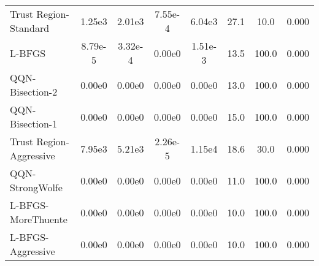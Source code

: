 \documentclass{article}
\begin{document}
\begin{table}[htbp]
{\begin{tabular}{p{2.5cm}*{7}{c}}
Trust Region-Standard & 1.25e3 & 2.01e3 & 7.55e-4 & 6.04e3 & 27.1 & 10.0 & 0.000 \\
L-BFGS & 8.79e-5 & 3.32e-4 & 0.00e0 & 1.51e-3 & 13.5 & 100.0 & 0.000 \\
QQN-Bisection-2 & 0.00e0 & 0.00e0 & 0.00e0 & 0.00e0 & 13.0 & 100.0 & 0.000 \\
QQN-Bisection-1 & 0.00e0 & 0.00e0 & 0.00e0 & 0.00e0 & 15.0 & 100.0 & 0.000 \\
Trust Region-Aggressive & 7.95e3 & 5.21e3 & 2.26e-5 & 1.15e4 & 18.6 & 30.0 & 0.000 \\
QQN-StrongWolfe & 0.00e0 & 0.00e0 & 0.00e0 & 0.00e0 & 11.0 & 100.0 & 0.000 \\
L-BFGS-MoreThuente & 0.00e0 & 0.00e0 & 0.00e0 & 0.00e0 & 10.0 & 100.0 & 0.000 \\
L-BFGS-Aggressive & 0.00e0 & 0.00e0 & 0.00e0 & 0.00e0 & 10.0 & 100.0 & 0.000 \\
\bottomrule
\end{tabular}
}
\end{table}
\end{document}
